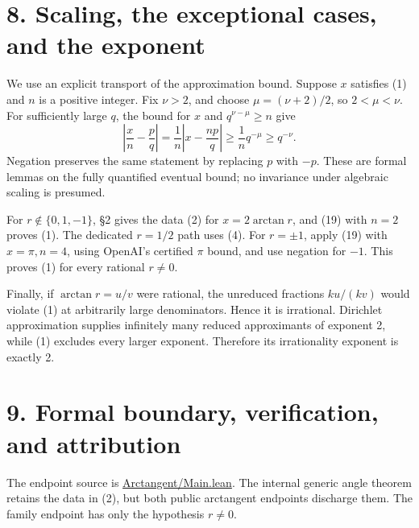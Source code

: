 \documentclass[11pt]{article}
\begin{document}
\section{8. Scaling, the exceptional cases, and the
exponent}\label{scaling-the-exceptional-cases-and-the-exponent}

We use an explicit transport of the approximation bound. Suppose \(x\)
satisfies (1) and \(n\) is a positive integer. Fix \(\nu>2\), and choose
\(\mu=(\nu+2)/2\), so \(2<\mu<\nu\). For sufficiently large \(q\), the
bound for \(x\) and \(q^{\nu-\mu}\ge n\) give \[
\left|\frac xn-\frac pq\right|
=\frac1n\left|x-\frac{np}{q}\right|
\ge\frac1n q^{-\mu}\ge q^{-\nu}.
\tag{19}
\] Negation preserves the same statement by replacing \(p\) with \(-p\).
These are formal lemmas on the fully quantified eventual bound; no
invariance under algebraic scaling is presumed.

For \(r\notin\{0,1,-1\}\), §2 gives the data (2) for \(x=2\arctan r\),
and (19) with \(n=2\) proves (1). The dedicated \(r=1/2\) path uses (4).
For \(r=\pm1\), apply (19) with \(x=\pi,n=4\), using OpenAI's certified
\(\pi\) bound, and use negation for \(-1\). This proves (1) for every
rational \(r\ne0\).

Finally, if \(\arctan r=u/v\) were rational, the unreduced fractions
\(ku/(kv)\) would violate (1) at arbitrarily large denominators. Hence
it is irrational. Dirichlet approximation supplies infinitely many
reduced approximants of exponent 2, while (1) excludes every larger
exponent. Therefore its irrationality exponent is exactly 2.

\section{9. Formal boundary, verification, and
attribution}\label{formal-boundary-verification-and-attribution}

The endpoint source is
\href{lean/Arctangent/Main.lean}{Arctangent/Main.lean}. The internal
generic angle theorem retains the data in (2), but both public
arctangent endpoints discharge them. The family endpoint has only the
hypothesis \(r\ne0\).
\end{document}
